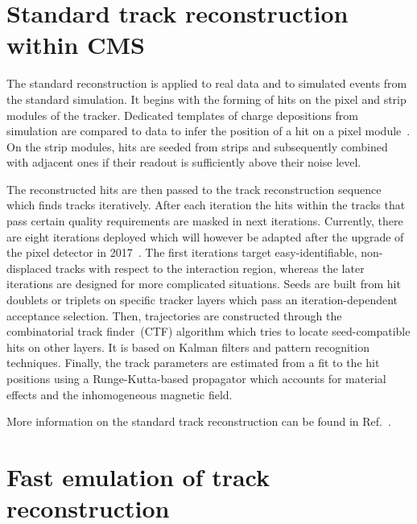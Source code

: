 \documentclass[a4paper]{jpconf}
\begin{document}
\section{Standard track reconstruction within CMS}
The standard reconstruction is applied to real data and to simulated events from the standard simulation. It begins with the forming of hits on the pixel and strip modules of the tracker. Dedicated templates of charge depositions from simulation are compared to data to infer the position of a hit on a pixel module~\cite{pixelav}. On the strip modules, hits are seeded from strips and subsequently combined with adjacent ones if their readout is sufficiently above their noise level.

The reconstructed hits are then passed to the track reconstruction sequence which finds tracks iteratively. After each iteration the hits within the tracks that pass certain quality requirements are masked in next iterations. Currently, there are eight iterations deployed which will however be adapted after the upgrade of the pixel detector in 2017~\cite{pixelphase1}. The first iterations target easy-identifiable, non-displaced tracks with respect to the interaction region, whereas the later iterations are designed for more complicated situations. Seeds are built from hit doublets or triplets on specific tracker layers which pass an iteration-dependent acceptance selection. Then, trajectories are constructed through the combinatorial track finder~(CTF) algorithm which tries to locate seed-compatible hits on other layers. It is based on Kalman filters and pattern recognition techniques.  Finally, the track parameters are estimated from a fit to the hit positions using a Runge-Kutta-based propagator which accounts for material effects and the inhomogeneous magnetic field.

More information on the standard track reconstruction can be found in Ref.~\cite{trackreco}.


\section{Fast emulation of track reconstruction}
\end{document}
